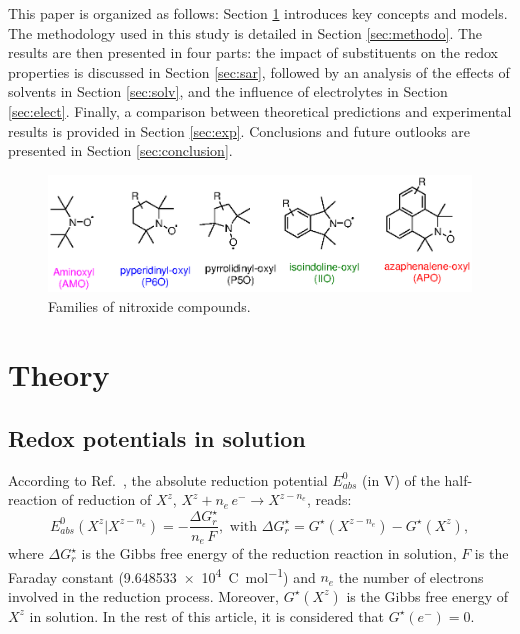 \documentclass[review,preprint]{elsarticle}
\begin{document}
This paper is organized as follows: Section \ref{sec:theory} introduces key concepts and models. The methodology used in this study is detailed in Section \ref{sec:methodo}. The results are then presented in four parts: the impact of substituents on the redox properties is discussed in Section \ref{sec:sar}, followed by an analysis of the effects of solvents in Section \ref{sec:solv}, and the influence of electrolytes in Section \ref{sec:elect}. Finally, a comparison between theoretical predictions and experimental results is provided in Section \ref{sec:exp}. Conclusions and future outlooks are presented in Section \ref{sec:conclusion}.

\begin{figure}[!h]
	\centering
	\includegraphics[width=\linewidth]{Figure2}
	\caption{Families of nitroxide compounds.}
	\label{fig:families}
\end{figure}

\section{Theory}\label{sec:theory}

\subsection{Redox potentials in solution}

According to Ref.~\cite{marenichComputationalElectrochemistryPrediction2014}, the absolute reduction potential $E_{abs}^0$ (in \si{\volt}) of the half-reaction of reduction of $X^z$, $X^{z} + n_e\,e^- \rightarrow X^{z-n_e}$, reads: \begin{equation}
	E_{abs}^0(X^{z}|X^{z-n_e}) = -\frac{\Delta G_{r}^\star}{n_e\,F}, \text{ with } \Delta G_{r}^\star = G^\star(X^{z-n_e}) - G^\star(X^z), \label{eq:nernst}
\end{equation}
where $\Delta G_{r}^\star$ is the Gibbs free energy of the reduction reaction in solution, $F$ is the Faraday constant (\SI{9.648533e4}{\coulomb\per\mole}) and $n_e$ the number of electrons involved in the reduction process. Moreover, $G^\star(X^z)$ is the Gibbs free energy of $X^z$ in solution.  In the rest of this article, it is considered that $G^\star(e^-) = 0$.
\end{document}
